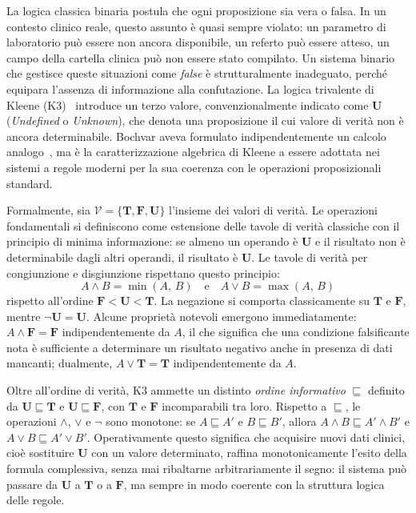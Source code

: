 La logica classica binaria postula che ogni proposizione sia vera o falsa.
In un contesto clinico reale, questo assunto è quasi sempre violato: un
parametro di laboratorio può essere non ancora disponibile, un referto può
essere atteso, un campo della cartella clinica può non essere stato compilato.
Un sistema binario che gestisce queste situazioni come \emph{false} è
strutturalmente inadeguato, perché equipara l'assenza di informazione alla
confutazione. La logica trivalente di Kleene (K3)~\cite{kleene1952introduction}
introduce un terzo valore, convenzionalmente indicato come $\mathbf{U}$
(\emph{Undefined} o \emph{Unknown}), che denota una proposizione il cui valore
di verità non è ancora determinabile. Bochvar aveva formulato
indipendentemente un calcolo analogo~\cite{bochvar1938}, ma è la
caratterizzazione algebrica di Kleene a essere adottata nei sistemi a regole
moderni per la sua coerenza con le operazioni proposizionali standard.

Formalmente, sia $\mathcal{V} = \{\mathbf{T}, \mathbf{F}, \mathbf{U}\}$
l'insieme dei valori di verità. Le operazioni fondamentali si definiscono
come estensione delle tavole di verità classiche con il principio di
minima informazione: se almeno un operando è $\mathbf{U}$ e il risultato
non è determinabile dagli altri operandi, il risultato è $\mathbf{U}$.
Le tavole di verità per congiunzione e disgiunzione rispettano questo principio:
\[
  A \land B = \min(A,\, B) \quad\text{e}\quad A \lor B = \max(A,\, B)
\]
rispetto all'ordine $\mathbf{F} < \mathbf{U} < \mathbf{T}$. La negazione
si comporta classicamente su $\mathbf{T}$ e $\mathbf{F}$, mentre
$\lnot\mathbf{U} = \mathbf{U}$. Alcune proprietà notevoli emergono
immediatamente: $A \land \mathbf{F} = \mathbf{F}$ indipendentemente da $A$,
il che significa che una condizione falsificante nota è sufficiente a
determinare un risultato negativo anche in presenza di dati mancanti; dualmente,
$A \lor \mathbf{T} = \mathbf{T}$ indipendentemente da $A$.

Oltre all'ordine di verità, K3 ammette un distinto \emph{ordine informativo}
$\sqsubseteq$ definito da $\mathbf{U} \sqsubseteq \mathbf{T}$ e
$\mathbf{U} \sqsubseteq \mathbf{F}$, con $\mathbf{T}$ e $\mathbf{F}$
incomparabili tra loro. Rispetto a $\sqsubseteq$, le operazioni $\land$,
$\lor$ e $\lnot$ sono monotone: se $A \sqsubseteq A'$ e $B \sqsubseteq B'$,
allora $A \land B \sqsubseteq A' \land B'$ e $A \lor B \sqsubseteq A' \lor B'$.
Operativamente questo significa che acquisire nuovi dati clinici, cioè
sostituire $\mathbf{U}$ con un valore determinato, raffina monotonicamente
l'esito della formula complessiva, senza mai ribaltarne arbitrariamente il
segno: il sistema può passare da $\mathbf{U}$ a $\mathbf{T}$ o a $\mathbf{F}$,
ma sempre in modo coerente con la struttura logica delle regole.

